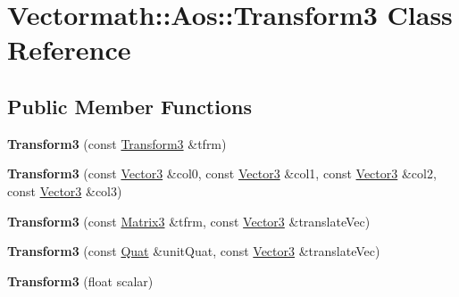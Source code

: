 \hypertarget{classVectormath_1_1Aos_1_1Transform3}{}\section{Vectormath\+:\+:Aos\+:\+:Transform3 Class Reference}
\label{classVectormath_1_1Aos_1_1Transform3}
\subsection*{Public Member Functions}
\begin{DoxyCompactItemize}
\item 
\mbox{\label{classVectormath_1_1Aos_1_1Transform3_aafa1a3ff376c54610ad183b231c32193}} 
{\bfseries Transform3} (const \hyperlink{classVectormath_1_1Aos_1_1Transform3}{Transform3} \&tfrm)
\item 
\mbox{\label{classVectormath_1_1Aos_1_1Transform3_aede20208cca61cb3153849707fcd05c7}} 
{\bfseries Transform3} (const \hyperlink{classVectormath_1_1Aos_1_1Vector3}{Vector3} \&col0, const \hyperlink{classVectormath_1_1Aos_1_1Vector3}{Vector3} \&col1, const \hyperlink{classVectormath_1_1Aos_1_1Vector3}{Vector3} \&col2, const \hyperlink{classVectormath_1_1Aos_1_1Vector3}{Vector3} \&col3)
\item 
\mbox{\label{classVectormath_1_1Aos_1_1Transform3_a48b610b8feeb0c9a3e93ee050c7c1c6f}} 
{\bfseries Transform3} (const \hyperlink{classVectormath_1_1Aos_1_1Matrix3}{Matrix3} \&tfrm, const \hyperlink{classVectormath_1_1Aos_1_1Vector3}{Vector3} \&translate\+Vec)
\item 
\mbox{\label{classVectormath_1_1Aos_1_1Transform3_a54f039ec2e81b7a889897e2e363b8b0a}} 
{\bfseries Transform3} (const \hyperlink{classVectormath_1_1Aos_1_1Quat}{Quat} \&unit\+Quat, const \hyperlink{classVectormath_1_1Aos_1_1Vector3}{Vector3} \&translate\+Vec)
\item 
\mbox{\label{classVectormath_1_1Aos_1_1Transform3_a3cb83ed1cf9176ab1ac5b0392d48a9f3}} 
{\bfseries Transform3} (float scalar)
\item 
\mbox{\label{classVectormath_1_1Aos_1_1Transform3_ad7fcc2f67388c611c3db92461420c89c}} 

\end{DoxyCompactItemize}
